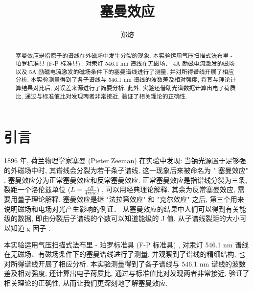 \documentclass[font=default]{mpltx}
\makeatletter
\newcommand{\note}[1]{{\color{gray}#1}}
\newcommand*\file[1]{\textbf{\texttt{#1}}}
\newcommand\releasedate{%
    \href{https://github.com/CastleStar14654/PKUMpLtX/releases/tag/\mpltx@fileversion}%
        {\mpltx@filedate, \mpltx@fileversion}}
\makeatother
\begin{document}
\title{塞曼效应} %
\author{郑熔} %
\date{}
\begin{abstract}
  塞曼效应是指原子的谱线在外磁场中发生分裂的现象. 
  本实验运用气压扫描式法布里 - 珀罗标准具 (F-P 标准具) , 
  对汞灯 546.1 nm 谱线在无磁场、 4A 励磁电流激发的磁场以及 5A 励磁电流激发的磁场条件下的塞曼谱线进行了测量, 
  并对所得谱线开展了相应分析.
  本实验测量得到了各子谱线与 546.1 nm 谱线的波数差及相对强度,
  将其与理论计算结果对比后,
  对误差来源进行了简要分析.
  此外, 实验还借助光谱数据计算出电子荷质比, 通过与标准值比对发现两者非常接近, 验证了相关理论的正确性.
\end{abstract}

\maketitle

\section{引言}
  1896 年, 荷兰物理学家塞曼 (Pieter Zeeman) 在实验中发现: 
  当钠光源置于足够强的外磁场中时, 其谱线会分裂为若干条子谱线, 
  这一现象后来被命名为  " 塞曼效应" . 塞曼效应分为正常塞曼效应和反常塞曼效应.
  正常塞曼效应是指谱线分裂为三条, 
  裂距一个洛伦兹单位 ($\tilde{L} = \frac{eB}{4\pi mc}$) , 可以用经典理论解释.
  其余为反常塞曼效应, 需要用量子理论解释.
  塞曼效应是继 "法拉第效应" 和 "克尔效应" 之后, 第三个用来说明磁场和电场对光产生影响的例证．
  从塞曼效应的结果中人们可以得到有关能级的数据, 即由分裂后子谱线的个数可以知道能级的 J 值, 从子谱线裂距的大小可以知道 g 因子 \cite{jindaiwulishiyan}.
  \par
  本实验运用气压扫描式法布里 - 珀罗标准具 (F-P 标准具) , 
  对汞灯 546.1 nm 谱线在无磁场、有磁场条件下的塞曼谱线进行了测量, 
  并观察到了谱线的精细结构, 也对所得谱线开展了相应分析.
  本实验测量得到了各子谱线与 546.1 nm 谱线的波数差及相对强度,
  还计算出电子荷质比, 通过与标准值比对发现两者非常接近, 验证了相关理论的正确性, 从而让我们更深刻地了解塞曼效应.
\end{document}
